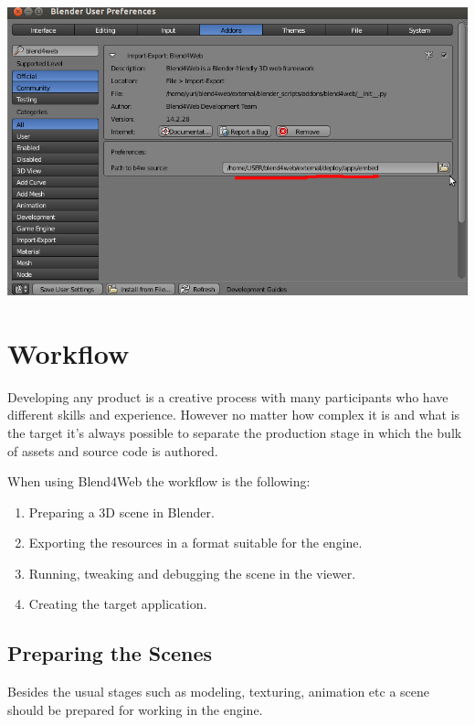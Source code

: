 \documentclass[a4paper,12pt,oneside]{sphinxmanual}
\begin{document}
{\hfill\includegraphics[width=1.000\linewidth]{user_preferences_enable_addon_HTML_option.jpg}\hfill}


\chapter{Workflow}
\label{workflow::doc}\label{workflow:working-process-stages}\label{workflow:id1}
Developing any product is a creative process with many participants who have different skills and experience. However no matter how complex it is and what is the target it's always possible to separate the production stage in which the bulk of assets and source code is authored.

When using Blend4Web the workflow is the following:
\begin{enumerate}
\item {} 
Preparing a 3D scene in Blender.

\item {} 
Exporting the resources in a format suitable for the engine.

\item {} 
Running, tweaking and debugging the scene in the viewer.

\item {} 
Creating the target application.

\end{enumerate}


\section{Preparing the Scenes}
\label{workflow:id2}
Besides the usual stages such as modeling, texturing, animation etc a scene should be prepared for working in the engine.
\end{document}
